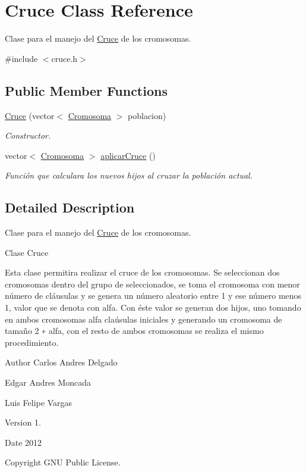 \hypertarget{classCruce}{\section{Cruce Class Reference}
\label{classCruce}
}


Clase para el manejo del \hyperlink{classCruce}{Cruce} de los cromosomas.  




{\ttfamily \#include $<$cruce.\-h$>$}

\subsection*{Public Member Functions}
\begin{DoxyCompactItemize}
\item 
\hyperlink{classCruce_aed65682d35805efe97e0d72d72f9e656}{Cruce} (vector$<$ \hyperlink{classCromosoma}{Cromosoma} $>$ poblacion)
\begin{DoxyCompactList}\small\item\em Constructor. \end{DoxyCompactList}\item 
vector$<$ \hyperlink{classCromosoma}{Cromosoma} $>$ \hyperlink{classCruce_aa1c30687e13accb4b5f6f54533608ea3}{aplicar\-Cruce} ()
\begin{DoxyCompactList}\small\item\em Función que calculara los nuevos hijos al cruzar la población actual. \end{DoxyCompactList}\end{DoxyCompactItemize}


\subsection{Detailed Description}
Clase para el manejo del \hyperlink{classCruce}{Cruce} de los cromosomas. 

\begin{DoxyVerb}Clase Cruce
\end{DoxyVerb}


Esta clase permitira realizar el cruce de los cromosomas. Se seleccionan dos cromosomas dentro del grupo de seleccionados, se toma el cromosoma con menor número de cláusulas y se genera un número aleatorio entre 1 y ese número menos 1, valor que se denota con alfa. Con éste valor se generan dos hijos, uno tomando en ambos cromosomas alfa claúsulas iniciales y generando un cromosoma de tamaño 2 ∗ alfa, con el resto de ambos cromosomas se realiza el mismo procedimiento. \begin{DoxyAuthor}{Author}
Carlos Andres Delgado 

Edgar Andres Moncada 

Luis Felipe Vargas 
\end{DoxyAuthor}
\begin{DoxyVersion}{Version}
1. 
\end{DoxyVersion}
\begin{DoxyDate}{Date}
2012 
\end{DoxyDate}
\begin{DoxyCopyright}{Copyright}
G\-N\-U Public License. 
\end{DoxyCopyright}


